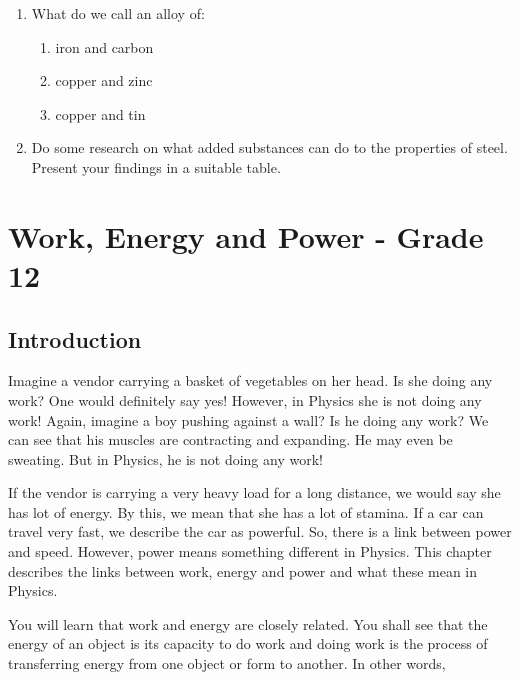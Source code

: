 \begin{enumerate}
\item What do we call an alloy of:
\begin{enumerate}
\item iron and carbon
\item copper and zinc 
\item copper and tin
\end{enumerate}

\item Do some research on what added substances can do to the properties of steel. Present your findings in a suitable table.
 
\end{enumerate}







\chapter{Work, Energy and Power - Grade 12}
\label{p:m:wpe12}


\section{Introduction}
Imagine a vendor carrying a basket of vegetables on her head. Is she doing any work? One would definitely say yes! However, in Physics she is not doing any work! Again, imagine a boy pushing against a wall? Is he doing any work? We can see that his muscles are contracting and expanding. He may even be sweating. But in Physics, he is not doing any work!

If the vendor is carrying a very heavy load for a long distance, we would say she has lot of energy. By this, we mean that she has a lot of stamina. If a car can travel very fast, we describe the car as powerful. So, there is a link between power and speed. However, power means something different in Physics. This chapter describes the links between work, energy and power and what these mean in Physics.

You will learn that work and energy are closely related. You shall see that the energy of an object is its capacity to do work and doing work is the process of transferring energy from one object or form to another. In other
words,

